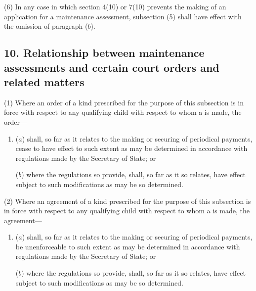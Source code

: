 \documentclass[a4paper]{article}
\begin{document}
(6) In any case in which section 4(10) or 7(10) prevents the making of an
application for a maintenance assessment, subsection (5) shall have effect with
the omission of paragraph ($b$).


\subsection{10. Relationship between
maintenance assessments
and certain court orders
and related matters}

(1) Where an order of a kind prescribed for the purpose of this subsection is in
force with respect to any qualifying child with respect to whom a 
is made, the order---
\begin{enumerate}\item[]
($a$)
shall, so far as it relates to the making or securing of periodical payments,
cease to have effect to such extent as may be determined in accordance
with regulations made by the Secretary of State; or

($b$)
where the regulations so provide, shall, so far as it so relates, have effect
subject to such modifications as may be so determined.
\end{enumerate}

(2)
Where an agreement of a kind prescribed for the purpose of this subsection
is in force with respect to any qualifying child with respect to whom a 
is made, the agreement---
\begin{enumerate}\item[]
($a$)
shall, so far as it relates to the making or securing of periodical payments,
be unenforceable to such extent as may be determined in accordance with
regulations made by the Secretary of State; or

($b$)
where the regulations so provide, shall, so far as it so relates, have effect
subject to such modifications as may be so determined.
\end{enumerate}
\end{document}
